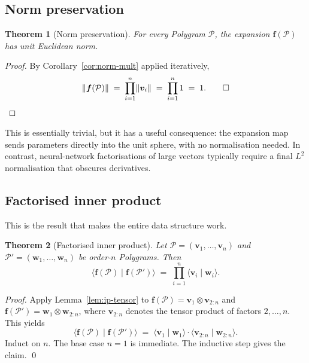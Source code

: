 \documentclass[11pt,letterpaper]{article}
\newtheorem{theorem}{Theorem}[section]
\theoremstyle{definition}
\newcommand{\Polygram}{\mathcal{P}}
\newcommand{\inner}[2]{\langle #1 \mid #2 \rangle}
\newcommand{\norm}[1]{\lVert #1 \rVert}
\begin{document}
\subsection{Norm preservation}

\begin{theorem}[Norm preservation]
\label{thm:norm}
For every Polygram $\Polygram$, the expansion $\bm{f}(\Polygram)$ has unit
Euclidean norm.
\end{theorem}
\begin{proof}
By Corollary~\ref{cor:norm-mult} applied iteratively,
\[
\norm{\bm{f}(\Polygram)}
   \;=\; \prod_{i=1}^{n} \norm{\bm{v}_{i}}
   \;=\; \prod_{i=1}^{n} 1
   \;=\; 1. \qed
\]
\end{proof}

This is essentially trivial, but it has a useful consequence: the expansion
map sends parameters directly into the unit sphere, with no normalisation
needed. In contrast, neural-network factorisations of large vectors typically
require a final $L^{2}$ normalisation that obscures derivatives.

\subsection{Factorised inner product}

This is the result that makes the entire data structure work.

\begin{theorem}[Factorised inner product]
\label{thm:fip}
Let $\Polygram = (\bm{v}_{1}, \dots, \bm{v}_{n})$ and
$\Polygram' = (\bm{w}_{1}, \dots, \bm{w}_{n})$ be order-$n$ Polygrams. Then
\[
\inner{\bm{f}(\Polygram)}{\bm{f}(\Polygram')}
   \;=\; \prod_{i=1}^{n} \inner{\bm{v}_{i}}{\bm{w}_{i}}.
\]
\end{theorem}
\begin{proof}
Apply Lemma~\ref{lem:ip-tensor} to $\bm{f}(\Polygram) = \bm{v}_{1} \otimes
\bm{v}_{2:n}$ and $\bm{f}(\Polygram') = \bm{w}_{1} \otimes \bm{w}_{2:n}$,
where $\bm{v}_{2:n}$ denotes the tensor product of factors $2, \dots, n$.
This yields
\[
\inner{\bm{f}(\Polygram)}{\bm{f}(\Polygram')}
   \;=\; \inner{\bm{v}_{1}}{\bm{w}_{1}} \cdot
        \inner{\bm{v}_{2:n}}{\bm{w}_{2:n}}.
\]
Induct on $n$. The base case $n = 1$ is immediate. The inductive step gives the
claim. \qed
\end{proof}
\end{document}

